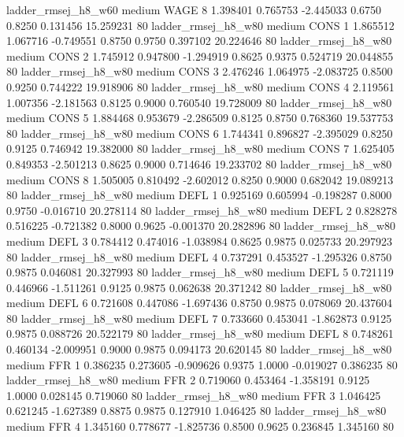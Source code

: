    ladder_rmsej_h8_w60     medium     WAGE                 8  1.398401 0.765753 -2.445033 0.6750 0.8250  0.131456   15.259231 80
   ladder_rmsej_h8_w80     medium     CONS                 1  1.865512 1.067716 -0.749551 0.8750 0.9750  0.397102   20.224646 80
   ladder_rmsej_h8_w80     medium     CONS                 2  1.745912 0.947800 -1.294919 0.8625 0.9375  0.524719   20.044855 80
   ladder_rmsej_h8_w80     medium     CONS                 3  2.476246 1.064975 -2.083725 0.8500 0.9250  0.744222   19.918906 80
   ladder_rmsej_h8_w80     medium     CONS                 4  2.119561 1.007356 -2.181563 0.8125 0.9000  0.760540   19.728009 80
   ladder_rmsej_h8_w80     medium     CONS                 5  1.884468 0.953679 -2.286509 0.8125 0.8750  0.768360   19.537753 80
   ladder_rmsej_h8_w80     medium     CONS                 6  1.744341 0.896827 -2.395029 0.8250 0.9125  0.746942   19.382000 80
   ladder_rmsej_h8_w80     medium     CONS                 7  1.625405 0.849353 -2.501213 0.8625 0.9000  0.714646   19.233702 80
   ladder_rmsej_h8_w80     medium     CONS                 8  1.505005 0.810492 -2.602012 0.8250 0.9000  0.682042   19.089213 80
   ladder_rmsej_h8_w80     medium     DEFL                 1  0.925169 0.605994 -0.198287 0.8000 0.9750 -0.016710   20.278114 80
   ladder_rmsej_h8_w80     medium     DEFL                 2  0.828278 0.516225 -0.721382 0.8000 0.9625 -0.001370   20.282896 80
   ladder_rmsej_h8_w80     medium     DEFL                 3  0.784412 0.474016 -1.038984 0.8625 0.9875  0.025733   20.297923 80
   ladder_rmsej_h8_w80     medium     DEFL                 4  0.737291 0.453527 -1.295326 0.8750 0.9875  0.046081   20.327993 80
   ladder_rmsej_h8_w80     medium     DEFL                 5  0.721119 0.446966 -1.511261 0.9125 0.9875  0.062638   20.371242 80
   ladder_rmsej_h8_w80     medium     DEFL                 6  0.721608 0.447086 -1.697436 0.8750 0.9875  0.078069   20.437604 80
   ladder_rmsej_h8_w80     medium     DEFL                 7  0.733660 0.453041 -1.862873 0.9125 0.9875  0.088726   20.522179 80
   ladder_rmsej_h8_w80     medium     DEFL                 8  0.748261 0.460134 -2.009951 0.9000 0.9875  0.094173   20.620145 80
   ladder_rmsej_h8_w80     medium      FFR                 1  0.386235 0.273605 -0.909626 0.9375 1.0000 -0.019027    0.386235 80
   ladder_rmsej_h8_w80     medium      FFR                 2  0.719060 0.453464 -1.358191 0.9125 1.0000  0.028145    0.719060 80
   ladder_rmsej_h8_w80     medium      FFR                 3  1.046425 0.621245 -1.627389 0.8875 0.9875  0.127910    1.046425 80
   ladder_rmsej_h8_w80     medium      FFR                 4  1.345160 0.778677 -1.825736 0.8500 0.9625  0.236845    1.345160 80
